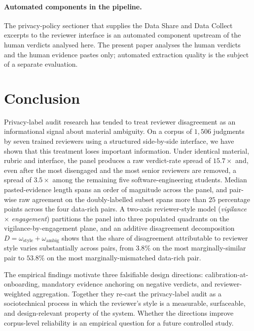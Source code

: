 \documentclass[11pt,a4paper]{article}
\begin{document}
\paragraph{Automated components in the pipeline.}
The privacy-policy sectioner that supplies the Data Share and Data
Collect excerpts to the reviewer interface is an automated
component upstream of the human verdicts analysed here. The present
paper analyses the human verdicts and the human evidence pastes
only; automated extraction quality is the subject of a separate
evaluation.

\section{Conclusion}
\label{sec:conclusion}

Privacy-label audit research has tended to treat reviewer
disagreement as an informational signal about material ambiguity.
On a corpus of $1{,}506$ judgments by seven trained reviewers using
a structured side-by-side interface, we have shown that this
treatment loses important information. Under identical material,
rubric and interface, the panel produces a raw verdict-rate spread
of $15.7{\times}$ and, even after the most disengaged and the most
senior reviewers are removed, a spread of $3.5{\times}$ among the
remaining five software-engineering students. Median pasted-evidence
length spans an order of magnitude across the panel, and pair-wise
raw agreement on the doubly-labelled subset spans more than
$25$ percentage points across the four data-rich pairs. A two-axis
reviewer-style model (\emph{vigilance} $\times$ \emph{engagement})
partitions the panel into three populated quadrants on the
vigilance-by-engagement plane, and an additive disagreement
decomposition $D = \omega_{\text{style}} + \omega_{\text{ambig}}$
shows that the share of disagreement attributable to reviewer
style varies substantially across pairs, from $3.8\%$ on the most
marginally-similar pair to $53.8\%$ on the most marginally-mismatched
data-rich pair.

The empirical findings motivate three falsifiable design directions:
calibration-at-onboarding, mandatory evidence anchoring on negative
verdicts, and reviewer-weighted aggregation. Together they re-cast
the privacy-label audit as a sociotechnical process in which the
reviewer's style is a measurable, surfaceable, and design-relevant
property of the system. Whether the directions improve corpus-level
reliability is an empirical question for a future controlled study.
\end{document}
